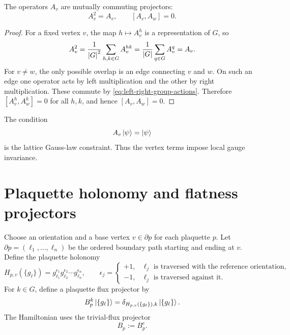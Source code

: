 \begin{proposition}
The operators \(A_v\) are mutually commuting projectors:
\begin{equation}
\label{eq:vertex-projector-algebra}
    A_v^2=A_v,
    \qquad
    [A_v,A_w]=0 .
\end{equation}
\end{proposition}

\begin{proof}
For a fixed vertex \(v\), the map \(h\mapsto A_v^h\) is a representation of
\(G\), so
\begin{equation}
\label{eq:vertex-projector-proof-1}
    A_v^2
    =\frac{1}{\left|G\right|^2}\sum_{h,k\in G}A_v^{hk}
    =\frac{1}{\left|G\right|}\sum_{q\in G}A_v^q
    =A_v .
\end{equation}
For \(v\neq w\), the only possible overlap is an edge connecting \(v\) and
\(w\).  On such an edge one operator acts by left multiplication and the other
by right multiplication.  These commute by \cref{eq:left-right-group-actions}.
Therefore \([A_v^h,A_w^k]=0\) for all \(h,k\), and hence
\([A_v,A_w]=0\).
\end{proof}

The condition
\begin{equation}
\label{eq:gauge-invariant-state-condition}
    A_v\left|\psi\right\rangle=\left|\psi\right\rangle
\end{equation}
is the lattice Gauss-law constraint.  Thus the vertex terms impose local gauge
invariance.

\section{Plaquette holonomy and flatness projectors}
\label{sec:quantum-double-plaquette-operators}

Choose an orientation and a base vertex \(v\in\partial p\) for each plaquette
\(p\).  Let \(\partial p=(\ell_1,\ldots,\ell_n)\) be the ordered boundary path
starting and ending at \(v\).  Define the plaquette holonomy
\begin{equation}
\label{eq:plaquette-holonomy}
    H_{p,v}(\{g_{\ell}\})
    =
    g_{\ell_1}^{\epsilon_1}
    g_{\ell_2}^{\epsilon_2}
    \cdots
    g_{\ell_n}^{\epsilon_n},
    \qquad
    \epsilon_j=\begin{cases}
        +1, & \ell_j\text{ is traversed with the reference orientation},\\
        -1, & \ell_j\text{ is traversed against it}.
    \end{cases}
\end{equation}
For \(k\in G\), define a plaquette flux projector by
\begin{equation}
\label{eq:plaquette-flux-projector-k}
    B_p^k\left|\{g_{\ell}\}\right\rangle
    =
    \delta_{H_{p,v}(\{g_{\ell}\}),k}\left|\{g_{\ell}\}\right\rangle .
\end{equation}
The Hamiltonian uses the trivial-flux projector
\begin{equation}
\label{eq:quantum-double-plaquette-projector}
    B_p:=B_p^e .
\end{equation}

